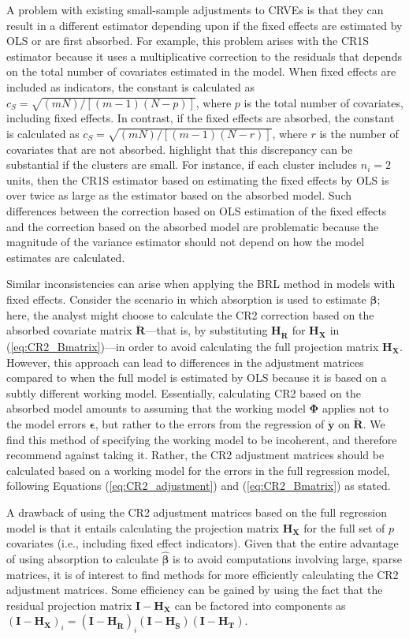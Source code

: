 \documentclass[draft]{ectaart}\usepackage[]{graphicx}\usepackage[]{color}
\newcommand{\bm}{\mathbf}
\newcommand{\bs}{\boldsymbol}
\begin{document}
A problem with existing small-sample adjustments to CRVEs is that they can result in a different estimator depending upon if the fixed effects are estimated by OLS or are first absorbed. 
For example, this problem arises with the CR1S estimator because it uses a multiplicative correction to the residuals that depends on the total number of covariates estimated in the model. 
When fixed effects are included as indicators, the constant is calculated as $c_S = \sqrt{(mN) / [(m - 1)(N - p)]}$, where $p$ is the total number of covariates, including fixed effects. 
In contrast, if the fixed effects are absorbed, the constant is calculated as $c_S = \sqrt{(mN) / [(m - 1)(N - r)]}$, where $r$ is the number of covariates that are not absorbed. 
\citet{Cameron2015practitioners} highlight that this discrepancy can be substantial if the clusters are small. For instance, if each cluster includes $n_i = 2$ units, then the CR1S estimator based on estimating the fixed effects by OLS is over twice as large as the estimator based on the absorbed model.
Such differences between the correction based on OLS estimation of the fixed effects and the correction based on the absorbed model are problematic because the magnitude of the variance estimator should not depend on how the model estimates are calculated. 

Similar inconsistencies can arise when applying the BRL method in models with fixed effects. 
Consider the scenario in which absorption is used to estimate $\bs\beta$; here, the analyst might choose to calculate the CR2 correction based on the absorbed covariate matrix $\bm{\ddot{R}}$---that is, by substituting $\bm{H_{\ddot{R}}}$ for $\bm{H_X}$ in (\ref{eq:CR2_Bmatrix})---in order to avoid calculating the full projection matrix $\bm{H_X}$. 
However, this approach can lead to differences in the adjustment matrices compared to when the full model is estimated by OLS because it is based on a subtly different working model. 
Essentially, calculating CR2 based on the absorbed model amounts to assuming that the working model $\bs\Phi$ applies not to the model errors $\bs\epsilon$, but rather to the errors from the regression of $\bm{\ddot{y}}$ on $\bm{\ddot{R}}$.
We find this method of specifying the working model to be incoherent, and therefore recommend against taking it.
Rather, the CR2 adjustment matrices should be calculated based on a working model for the errors in the full regression model, following Equations (\ref{eq:CR2_adjustment}) and (\ref{eq:CR2_Bmatrix}) as stated. 

A drawback of using the CR2 adjustment matrices based on the full regression model is that it entails calculating the projection matrix $\bm{H_X}$ for the full set of $p$ covariates (i.e., including fixed effect indicators). Given that the entire advantage of using absorption to calculate $\hat{\bs\beta}$ is to avoid computations involving large, sparse matrices, it is of interest to find methods for more efficiently calculating the CR2 adjustment matrices. Some efficiency can be gained by using the fact that the residual projection matrix $\bm{I} - \bm{H_X}$ can be factored into components as $\left(\bm{I} - \bm{H_X}\right)_i = \left(\bm{I} - \bm{H_{\ddot{R}}}\right)_i \left(\bm{I} - \bm{H_{\ddot{S}}}\right) \left(\bm{I} - \bm{H_T}\right)$.
\end{document}
